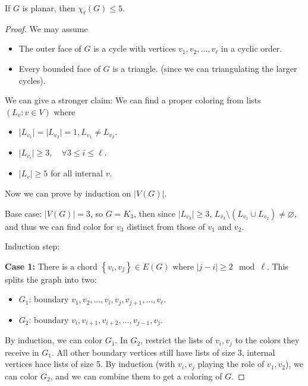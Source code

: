 \begin{theorem}[Thomassen]
    If \(G\) is planar, then \(\chi _\ell (G) \le 5\).  
\end{theorem}

\begin{proof}
    We may assume 
    \begin{itemize}
        \item The outer face of \(G\) is a cycle with vertices \(v_1, v_2, \dots , v_{\ell} \) in a cyclic order. 
        \item Every bounded face of \(G\) is a triangle. (since we can triangulating the larger cycles). 
    \end{itemize}
    We can give a stronger claim: We can find a proper coloring from lists \((L_v: v \in V)\) where 
    \begin{itemize}
        \item \(\vert L_{v_1} \vert = \vert L_{v_2} \vert = 1, L_{v_1} \neq L_{v_2}\). 
        \item \(\vert L_{v_i} \vert \ge 3, \quad \forall 3 \le i \le \ell \). 
        \item \(\vert L_v \vert \ge 5 \) for all internal \(v\).    
    \end{itemize} 
    Now we can prove by induction on \(\vert V(G) \vert \). 

    Base case: \(\vert V(G) \vert = 3\), so \(G = K_3\), then since \(\vert L_{v_3} \vert \ge 3 \), \(L_{v_3} \setminus (L_{v_1} \cup L_{v_2}) \neq \varnothing\), and thus we can find color for \(v_3\) distinct from those of \(v_1\) and \(v_2\). 

    Induction step: 

    \textbf{Case 1:} There is a chord \(\left\{ v_i, v_j \right\} \in E(G) \) where \(\vert j - i \vert \ge 2 \mod{\ell}\). This splits the graph into two: 
    \begin{itemize}
        \item \(G_1\): boundary \(v_1, v_2, \dots , v_i, v_j, v_{j+1}, \dots , v_{\ell}\). 
        \item \(G_2\): boundary \(v_i, v_{i+1}, v_{i+2}, \dots , v_{j-1}, v_j\).    
    \end{itemize}       
    By induction, we can color \(G_1\). In \(G_2\), restrict the lists of \(v_i, v_j\) to the colors they receive in \(G_1\). All other boundary vertices still have lists of size 3, internal vertices hace lists of size 5. By induction (with \(v_i, v_j\) playing the role of \(v_1, v_2\)), we can color \(G_2\), and we can combine them to get a coloring of \(G\). 


\end{proof}
